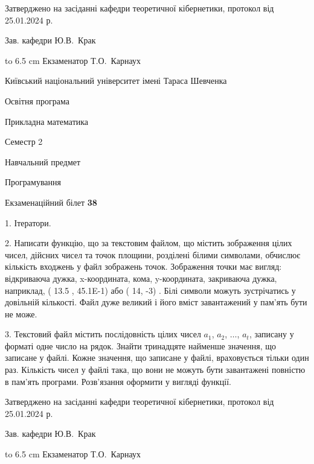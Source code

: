 \documentclass[12pt, ukrainian]{article}
\begin{document}
{\smallskip\smallskip \begin {scriptsize} Затверджено на засіданні кафедри теоретичної кібернетики, протокол   від   25.01.2024 р.\par\smallskip\smallskip\smallskip\smallskip
{\parbox {6.5 cm} {Зав. кафедри \dotfill Ю.В.~Крак}}\hspace {0.7cm} {\hbox to 6.5 cm { Екзаменатор \dotfill Т.О.~Карнаух}} \end{scriptsize}}
\vspace{0.9cm}
{{\begin {scriptsize}\par
{ \center  Київський національний університет імені Тараса Шевченка \par}
{\parbox {5 cm}{Освітня програма \hfill}{\parbox {7 cm}{Прикладна математика\hfill}}\parbox {6 cm}{\hfill Семестр 2}}\par
{\parbox {5 cm} {Навчальний предмет \hfill}\parbox {7 cm}{Програмування \hfill}\parbox {6cm}{\hfill}\par}\vspace{-15pt} \end{scriptsize}}{\center Екзаменаційний білет \No \textbf { 38 }\par}}
{%
1. Ітератори.%
\par
2. Написати функцію, що за текстовим файлом, що містить зображення цілих чисел, дійсних чисел та точок площини, розділені білими символами, обчислює кількість входжень у файл зображень точок. Зображення точки має вигляд: відкриваюча дужка, x-координата, кома, y-координата, закриваюча дужка, наприклад, ( 13.5 , 45.1E-1) або ( 14, -3) . Білі символи можуть зустрічатись у довільній кількості. Файл дуже великий і його вміст завантажений у пам'ять бути не може.

\par
3. Текстовий файл містить послідовність цілих чисел $a_1$, $a_2$, $\ldots$, $a_t$, записану у форматі одне число на рядок. Знайти тринадцяте найменше значення, що записане у файлі. Кожне значення, що записане у файлі, враховується тільки один раз. Кількість чисел у файлі така, що вони не можуть бути завантажені повністю в пам'ять програми. Розв'язання оформити у вигляді функції.

}
{\smallskip\smallskip \begin {scriptsize} Затверджено на засіданні кафедри теоретичної кібернетики, протокол   від   25.01.2024 р.\par\smallskip\smallskip\smallskip\smallskip
{\parbox {6.5 cm} {Зав. кафедри \dotfill Ю.В.~Крак}}\hspace {0.7cm} {\hbox to 6.5 cm { Екзаменатор \dotfill Т.О.~Карнаух}} \end{scriptsize}}
\end{document}
